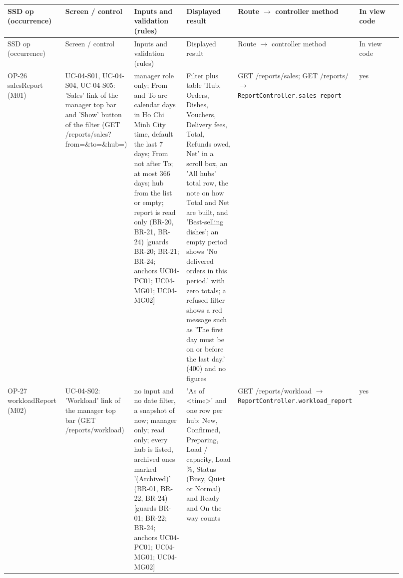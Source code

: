 \begingroup\footnotesize
\begin{longtable}{>{\raggedright\arraybackslash}p{0.1533\linewidth}>{\raggedright\arraybackslash}p{0.1533\linewidth}>{\raggedright\arraybackslash}p{0.1533\linewidth}>{\raggedright\arraybackslash}p{0.1533\linewidth}>{\raggedright\arraybackslash}p{0.1533\linewidth}>{\raggedright\arraybackslash}p{0.1533\linewidth}}
SSD op (occurrence) & Screen / control & Inputs and validation (rules) & Displayed result & Route \ensuremath{\rightarrow} controller method & In view code \\
\hline\endfirsthead
SSD op (occurrence) & Screen / control & Inputs and validation (rules) & Displayed result & Route \ensuremath{\rightarrow} controller method & In view code \\
\hline\endhead
OP-26 salesReport (M01) & UC-04-S01, UC-04-S04, UC-04-S05: 'Sales' link of the manager top bar and 'Show' button of the filter (GET /reports/sales?from=\&to=\&hub=) & manager role only; From and To are calendar days in Ho Chi Minh City time, default the last 7 days; From not after To; at most 366 days; hub from the list or empty; report is read only (BR-20, BR-21, BR-24) [guards BR-20; BR-21; BR-24; anchors UC04-PC01; UC04-MG01; UC04-MG02] & Filter plus table 'Hub, Orders, Dishes, Vouchers, Delivery fees, Total, Refunds owed, Net' in a scroll box, an 'All hubs' total row, the note on how Total and Net are built, and 'Best-selling dishes'; an empty period shows 'No delivered orders in this period.' with zero totals; a refused filter shows a red message such as 'The first day must be on or before the last day.' (400) and no figures & GET /reports/sales; GET /reports/ \ensuremath{\rightarrow} \texttt{ReportController.\allowbreak{}sales\_\allowbreak{}report} & yes \\
OP-27 workloadReport (M02) & UC-04-S02: 'Workload' link of the manager top bar (GET /reports/workload) & no input and no date filter, a snapshot of now; manager only; read only; every hub is listed, archived ones marked '(Archived)' (BR-01, BR-22, BR-24) [guards BR-01; BR-22; BR-24; anchors UC04-PC01; UC04-MG01; UC04-MG02] & 'As of \textless{}time\textgreater{}' and one row per hub: New, Confirmed, Preparing, Load / capacity, Load \%, Status (Busy, Quiet or Normal) and Ready and On the way counts & GET /reports/workload \ensuremath{\rightarrow} \texttt{ReportController.\allowbreak{}workload\_\allowbreak{}report} & yes \\

\end{longtable}
